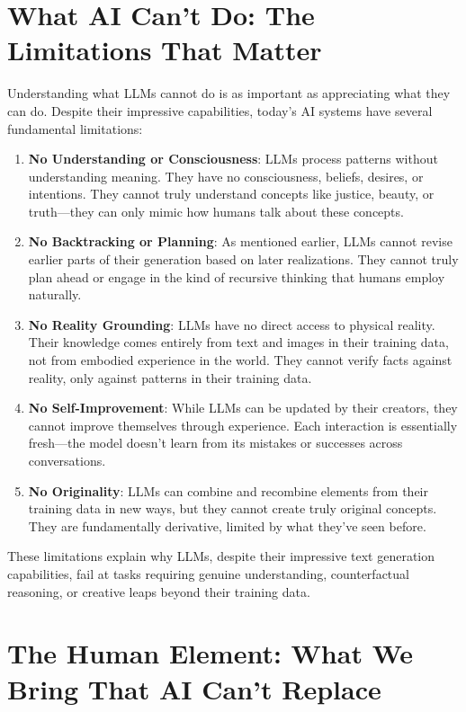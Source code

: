 \documentclass[
  Letterpaper,
]{scrbook}
\begin{document}
\section{What AI Can't Do: The Limitations That
Matter}\label{what-ai-cant-do-the-limitations-that-matter}

Understanding what LLMs cannot do is as important as appreciating what
they can do. Despite their impressive capabilities, today's AI systems
have several fundamental limitations:

\begin{enumerate}
\def\labelenumi{\arabic{enumi}.}
\item
  \textbf{No Understanding or Consciousness}: LLMs process patterns
  without understanding meaning. They have no consciousness, beliefs,
  desires, or intentions. They cannot truly understand concepts like
  justice, beauty, or truth---they can only mimic how humans talk about
  these concepts.
\item
  \textbf{No Backtracking or Planning}: As mentioned earlier, LLMs
  cannot revise earlier parts of their generation based on later
  realizations. They cannot truly plan ahead or engage in the kind of
  recursive thinking that humans employ naturally.
\item
  \textbf{No Reality Grounding}: LLMs have no direct access to physical
  reality. Their knowledge comes entirely from text and images in their
  training data, not from embodied experience in the world. They cannot
  verify facts against reality, only against patterns in their training
  data.
\item
  \textbf{No Self-Improvement}: While LLMs can be updated by their
  creators, they cannot improve themselves through experience. Each
  interaction is essentially fresh---the model doesn't learn from its
  mistakes or successes across conversations.
\item
  \textbf{No Originality}: LLMs can combine and recombine elements from
  their training data in new ways, but they cannot create truly original
  concepts. They are fundamentally derivative, limited by what they've
  seen before.
\end{enumerate}

These limitations explain why LLMs, despite their impressive text
generation capabilities, fail at tasks requiring genuine understanding,
counterfactual reasoning, or creative leaps beyond their training data.

\section{The Human Element: What We Bring That AI Can't
Replace}\label{the-human-element-what-we-bring-that-ai-cant-replace}
\end{document}
